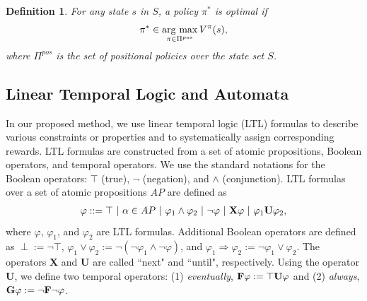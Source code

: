 \documentclass[letterpaper, 10 pt, conference]{ieeeconf}  %
\newtheorem{definition}{Definition}
\newcommand{\argmax}{\mathop{\rm arg~max}\limits}
\begin{document}
\begin{definition}
  For any state $s$ in $S$, a policy $\pi^{\ast}$ is optimal if
  \begin{align*}
    \pi^{\ast} \in \argmax_{\pi \in \Pi^{pos}} V^{\pi}(s),
  \end{align*}
where $\Pi^{pos}$ is the set of positional policies over the state set $S$.
\end{definition}

\subsection{Linear Temporal Logic and Automata}

In our proposed method, we use linear temporal logic (LTL) formulas to describe various constraints or properties and to systematically assign corresponding rewards.
LTL formulas are constructed from a set of atomic propositions, Boolean operators, and temporal operators. We use the standard notations for the Boolean operators: $\top$ (true), $\neg$ (negation), and $\land$ (conjunction).
LTL formulas over a set of atomic propositions $AP$ are defined as
\begin{align*}
  \varphi ::=\top\ |\ \alpha \in AP\ |\ \varphi_1 \land \varphi_2\ |\ \neg \varphi\ |\ \text{{\bf X}} \varphi\ |\ \varphi_1 \text{{\bf U}} \varphi_2,
\end{align*}
where $\varphi$, $\varphi_1$, and $\varphi_2$ are LTL formulas.
Additional Boolean operators are defined as $\perp := \neg \top $, $\varphi_1 \lor \varphi_2 := \neg(\neg \varphi_1 \land \neg \varphi)$, and $\varphi_1 \Rightarrow \varphi_2 := \neg \varphi_1 \lor \varphi_2$.
The operators {\bf X} and {\bf U} are called ``next" and ``until", respectively.
Using the operator {\bf U}, we define two temporal operators: (1) {\it eventually}, $\text{{\bf F}} \varphi := \top \text{{\bf U}} \varphi $ and (2) {\it always}, $\text{{\bf G}} \varphi := \neg \text{{\bf F}} \neg \varphi$.
\end{document}
